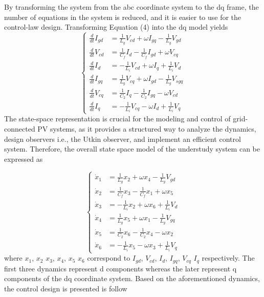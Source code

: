 \documentclass[preprint,12pt]{elsarticle}
\begin{document}
By transforming the system from the abc coordinate system to the dq frame, the number of equations in the system is reduced, and it is easier to use for the control-law design. Transforming Equation (4) into the dq model yields
\begin{equation}
\left\{
\begin{aligned}
    \frac{d}{dt} I_{gd} &= \frac{1}{L_g} V_{cd} + \omega I_{gq} - \frac{1}{L_g} V_{gd} \\
    \frac{d}{dt} V_{cd} &= \frac{1}{C_f} I_d - \frac{1}{C_f} I_{gd} + \omega V_{cq} \\
    \frac{d}{dt} I_d &= -\frac{1}{L_i} V_{cd} + \omega I_q + \frac{1}{L_i} V_d \\
    \frac{d}{dt} I_{gq} &= \frac{1}{L_g} V_{cq} + \omega I_{gd} - \frac{1}{L_g} V_{sgq}\\
    \frac{d}{dt} V_{cq} &= \frac{1}{C_2} I_q - \frac{1}{C_2} I_{gq} - \omega V_{cd} \\
    \frac{d}{dt} I_q &= -\frac{1}{L_i} V_{cq} - \omega I_d + \frac{1}{L_i} V_q
\end{aligned}
\right.
\end{equation}
The state-space representation is crucial for the modeling and control of grid-connected PV systems, as it provides a structured way to analyze the dynamics, design observers i.e., the Utkin observer, and implement an efficient control system. Therefore, the overall state space model of the understudy system can be expressed as

\begin{equation}
\left\{
\begin{aligned}
    \dot{x}_1 &= \frac{1}{L_g} x_2 + \omega x_4 - \frac{1}{L_g} V_{gd} \\
    \dot{x}_2 &= \frac{1}{C_f} x_3 - \frac{1}{C_f} x_1 + \omega x_5 \\
    \dot{x}_3 &= -\frac{1}{L_i} x_2 + \omega x_6 + \frac{1}{L_i} V_d \\
    \dot{x}_4 &= \frac{1}{L_g} x_5 + \omega x_1 - \frac{1}{L_g} V_{gq}\\
    \dot{x}_5 &= \frac{1}{C_2} x_6 - \frac{1}{C_2} x_4 - \omega x_2 \\
    \dot{x}_6 &= -\frac{1}{L_i} x_5 - \omega x_3 + \frac{1}{L_i} V_q
\end{aligned}
\right.
\end{equation}
where \(x_1\), \(x_2\) \(x_3\), \(x_4\), \(x_5\) \(x_6\) correspond to \(I_{gd}\),  \(V_{cd}\), \(I_d\), \(I_{gq}\), \(V_{cq}\) \(I_q\) respectively. The first three dynamics represent d components whereas the later represent q components of the dq coordinate system. Based on the aforementioned dynamics, the control design is presented is follow
\end{document}
